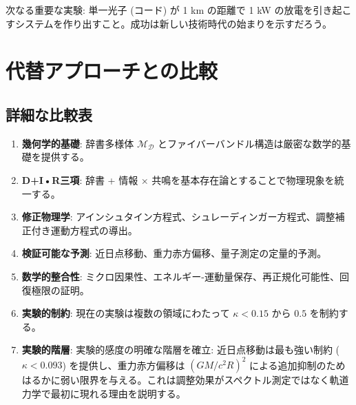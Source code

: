 \documentclass[11pt,a4paper]{article}
\begin{document}
	次なる重要な実験: 単一光子 (コード) が 1 km の距離で 1 kW の放電を引き起こすシステムを作り出すこと。成功は新しい技術時代の始まりを示すだろう。
	
	\section{代替アプローチとの比較}
	\subsection{詳細な比較表}
	\begin{enumerate}
		\item \textbf{幾何学的基礎}: 辞書多様体 $\mathcal{M}_{\mathcal{D}}$ とファイバーバンドル構造は厳密な数学的基礎を提供する。
		
		\item \textbf{D+I•R三項}: 辞書 + 情報 × 共鳴を基本存在論とすることで物理現象を統一する。
		
		\item \textbf{修正物理学}: アインシュタイン方程式、シュレーディンガー方程式、調整補正付き運動方程式の導出。
		
		\item \textbf{検証可能な予測}: 近日点移動、重力赤方偏移、量子測定の定量的予測。
		
		\item \textbf{数学的整合性}: ミクロ因果性、エネルギー-運動量保存、再正規化可能性、回復極限の証明。
		
		\item \textbf{実験的制約}: 現在の実験は複数の領域にわたって $\kappa < 0.15$ から $0.5$ を制約する。
		
		\item \textbf{実験的階層}: 実験的感度の明確な階層を確立: 近日点移動は最も強い制約 ($\kappa < 0.093$) を提供し、重力赤方偏移は $(GM/c^2R)^2$ による追加抑制のためはるかに弱い限界を与える。これは調整効果がスペクトル測定ではなく軌道力学で最初に現れる理由を説明する。
	\end{enumerate}
	
\end{document}
